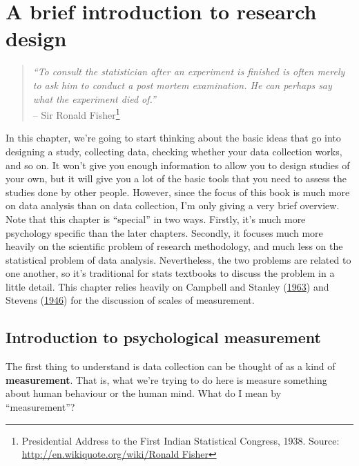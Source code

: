 \documentclass[
]{book}
\begin{document}
\hypertarget{a-brief-introduction-to-research-design}{%
\chapter{A brief introduction to research design}\label{a-brief-introduction-to-research-design}}

\begin{quote}
\emph{``To consult the statistician after an experiment is finished is often merely to ask him to conduct a post mortem examination. He can perhaps say what the experiment died of.''}\\
-- Sir Ronald Fisher\footnote{Presidential Address to the First Indian Statistical Congress, 1938. Source: \href{http://en.wikiquote.org/wik\%0Ai/Ronald\%20Fisher}{http://en.wikiquote.org/wiki/Ronald Fisher}}
\end{quote}

In this chapter, we're going to start thinking about the basic ideas that go into designing a study, collecting data, checking whether your data collection works, and so on. It won't give you enough information to allow you to design studies of your own, but it will give you a lot of the basic tools that you need to assess the studies done by other people. However, since the focus of this book is much more on data analysis than on data collection, I'm only giving a very brief overview. Note that this chapter is ``special'' in two ways. Firstly, it's much more psychology specific than the later chapters. Secondly, it focuses much more heavily on the scientific problem of research methodology, and much less on the statistical problem of data analysis. Nevertheless, the two problems are related to one another, so it's traditional for stats textbooks to discuss the problem in a little detail. This chapter relies heavily on Campbell and Stanley (\protect\hyperlink{ref-Campbell1963}{1963}) and Stevens (\protect\hyperlink{ref-Stevens1946}{1946}) for the discussion of scales of measurement.

\hypertarget{introduction-to-psychological-measurement}{%
\section{Introduction to psychological measurement}\label{introduction-to-psychological-measurement}}

The first thing to understand is data collection can be thought of as a kind of \textbf{measurement}. That is, what we're trying to do here is measure something about human behaviour or the human mind. What do I mean by ``measurement''?
\end{document}
